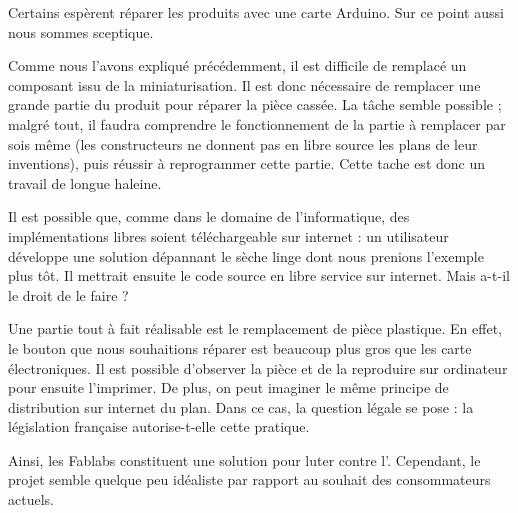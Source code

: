 \medbreak

Certains espèrent réparer les produits avec une carte Arduino. Sur ce point aussi nous sommes sceptique. 

Comme nous l'avons expliqué précédemment, il est difficile de remplacé un composant issu de la miniaturisation. Il est donc nécessaire de remplacer une grande partie du produit pour réparer la pièce cassée. La tâche semble possible ; malgré tout, il faudra comprendre le fonctionnement de la partie à remplacer par sois même (les constructeurs ne donnent pas en libre source les plans de leur inventions), puis réussir à reprogrammer cette partie. Cette tache est donc un travail de longue haleine. 

Il est possible que, comme dans le domaine de l'informatique, des implémentations libres soient téléchargeable sur internet : un utilisateur développe une solution dépannant le sèche linge dont nous prenions l'exemple plus tôt. Il mettrait ensuite le code source en libre service sur internet. Mais a-t-il le droit de le faire ? 

\medbreak 

Une partie tout à fait réalisable est le remplacement de pièce plastique. En effet, le bouton que nous souhaitions réparer est beaucoup plus gros que les carte électroniques. Il est possible d'observer la pièce et de la reproduire sur ordinateur pour ensuite l'imprimer. De plus, on peut imaginer le même principe de distribution sur internet du plan. Dans ce cas, la question légale se pose : la législation française autorise-t-elle cette pratique. 

\bigbreak

Ainsi, les Fablabs constituent une solution pour luter contre l'\op. Cependant, le projet semble quelque peu idéaliste par rapport au souhait des consommateurs actuels. 
\bigbreak


